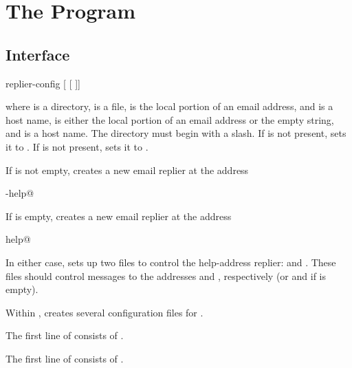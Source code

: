 
\chapter{The  Program}

\section{Interface}
\begin{code}
  replier-config     [  [  ]]
\end{code}
where  is a directory,  is a  file,
 is the local portion of an email address, and 
is a host name,  is either the local portion of an
email address or the empty string, and  is a host name.
The directory  must begin with a slash.
If  is not present,  sets it to
.  If  is not present, 
sets it to .

If  is not empty,  creates a new
email replier at the address
\begin{code}
  -help@
\end{code}

If  is empty,  creates a new email
replier at the address
\begin{code}
  help@
\end{code}

In either case,  sets up two  files to
control the help-address replier:  and
.  These files should control messages
to the addresses  and
, respectively (or
 and  if
 is empty).

Within ,  creates several configuration
files for .

The first line of  consists of .

The first line of  consists of .

